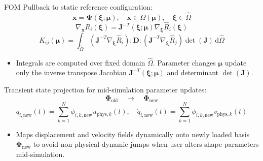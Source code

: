 \documentclass[12pt,a4paper,oneside]{report}
\newcommand{\vect}[1]{\mathbf{#1}}
\newcommand{\mat}[1]{\mathbf{#1}}
\begin{document}
FOM Pullback to static reference configuration:
\begin{equation}
\vect{x} = \boldsymbol{\Psi}(\boldsymbol{\xi}; \boldsymbol{\mu}), \quad \vect{x} \in \Omega(\boldsymbol{\mu}), \quad \boldsymbol{\xi} \in \hat{\Omega}
\end{equation}
\begin{equation}
\nabla_{\vect{x}} R_i(\boldsymbol{\xi}) = \mathbf{J}^{-T}(\boldsymbol{\xi}; \boldsymbol{\mu}) \nabla_{\boldsymbol{\xi}} \hat{R}_i(\boldsymbol{\xi})
\end{equation}
\begin{equation}
K_{ij}(\boldsymbol{\mu}) = \int_{\hat{\Omega}} \left( \mathbf{J}^{-T} \nabla_{\boldsymbol{\xi}} \hat{R}_i \right) : \mat{D} : \left( \mathbf{J}^{-T} \nabla_{\boldsymbol{\xi}} \hat{R}_j \right) \det(\mathbf{J}) \, \mathrm{d}\hat{\Omega}
\end{equation}
\begin{tcolorbox}[colback=gray!5!white,colframe=gray!60!black,title={Term Definitions \& Parameter Dependencies}]
\begin{itemize}
    \item Integrals are computed over fixed domain $\hat{\Omega}$. Parameter changes $\boldsymbol{\mu}$ update only the inverse transpose Jacobian $\mathbf{J}^{-T}(\boldsymbol{\xi}; \boldsymbol{\mu})$ and determinant $\det(\mathbf{J})$.
\end{itemize}
\end{tcolorbox}

Transient state projection for mid-simulation parameter updates:
\begin{equation}
    \mathbf{\Phi}_{\text{old}} \quad \longrightarrow \quad \mathbf{\Phi}_{\text{new}}
\end{equation}
\begin{equation}
    q_{i, \text{new}}(t) = \sum_{k=1}^N \phi_{i, k, \text{new}} u_{\text{phys}, k}(t), \quad \dot{q}_{i, \text{new}}(t) = \sum_{k=1}^N \phi_{i, k, \text{new}} v_{\text{phys}, k}(t)
\end{equation}
\begin{tcolorbox}[colback=gray!5!white,colframe=gray!60!black,title={Term Definitions \& Parameter Dependencies}]
\begin{itemize}
    \item Maps displacement and velocity fields dynamically onto newly loaded basis $\boldsymbol{\Phi}_{\text{new}}$ to avoid non-physical dynamic jumps when user alters shape parameters mid-simulation.
\end{itemize}
\end{tcolorbox}
\end{document}
